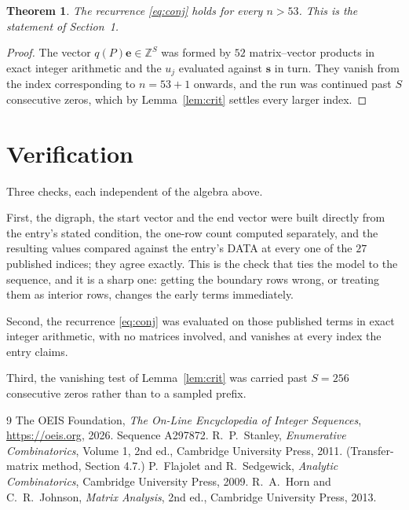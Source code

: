 \documentclass[11pt,a4paper]{article}
\theoremstyle{plain}
\newtheorem{theorem}{Theorem}
\theoremstyle{definition}
\begin{document}
\begin{theorem}
The recurrence \eqref{eq:conj} holds for every $n>53$. This is the statement of
Section~1.
\end{theorem}

\begin{proof}
The vector $q(P)\mathbf{e}\in\mathbb{Z}^{S}$ was formed by $52$ matrix--vector
products in exact integer arithmetic and the $u_j$ evaluated against $\mathbf{s}$ in turn.
They vanish from the index corresponding to $n=53+1$ onwards, and the run was continued
past $S$ consecutive zeros, which by Lemma~\ref{lem:crit} settles every larger index.
\end{proof}

\section{Verification}

Three checks, each independent of the algebra above.

First, the digraph, the start vector and the end vector were built directly from the
entry's stated condition, the one-row count computed separately, and the resulting values
compared against the entry's DATA at every one of the $27$ published indices; they
agree exactly. This is the check that ties the model to the sequence, and it is a sharp one:
getting the boundary rows wrong, or treating them as interior rows, changes the early terms
immediately.

Second, the recurrence \eqref{eq:conj} was evaluated on those published terms in exact
integer arithmetic, with no matrices involved, and vanishes at every index the entry claims.

Third, the vanishing test of Lemma~\ref{lem:crit} was carried past $S=256$ consecutive
zeros rather than to a sampled prefix.

\begin{thebibliography}{9}
 The OEIS Foundation, \emph{The On-Line Encyclopedia of Integer
Sequences}, \url{https://oeis.org}, 2026. Sequence A297872.
 R.~P.~Stanley, \emph{Enumerative Combinatorics}, Volume 1, 2nd ed.,
Cambridge University Press, 2011. (Transfer-matrix method, Section 4.7.)
 P.~Flajolet and R.~Sedgewick, \emph{Analytic Combinatorics}, Cambridge
University Press, 2009.
 R.~A.~Horn and C.~R.~Johnson, \emph{Matrix Analysis}, 2nd ed., Cambridge
University Press, 2013.
\end{thebibliography}
\end{document}
